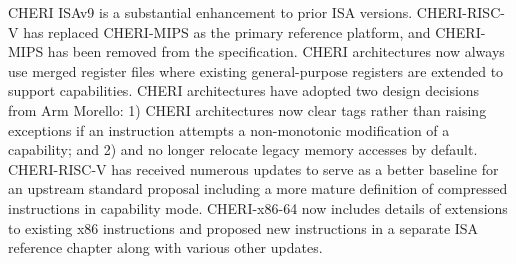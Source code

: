 CHERI ISAv9 is a substantial enhancement to prior ISA versions.
CHERI-RISC-V has replaced CHERI-MIPS as the primary reference
platform, and CHERI-MIPS has been removed from the specification.
CHERI architectures now always use merged register files where
existing general-purpose registers are extended to support
capabilities.
CHERI architectures have adopted two design decisions from Arm
Morello: 1) CHERI architectures now clear tags rather than raising
exceptions if an instruction attempts a non-monotonic modification
of a capability; and 2) \DDC{} and \PCC{} no longer relocate legacy
memory accesses by default.
CHERI-RISC-V has received numerous updates to serve as a better
baseline for an upstream standard proposal including a more mature
definition of compressed instructions in capability mode.
CHERI-x86-64 now includes details of extensions to existing x86
instructions and proposed new instructions in a separate ISA
reference chapter along with various other updates.
